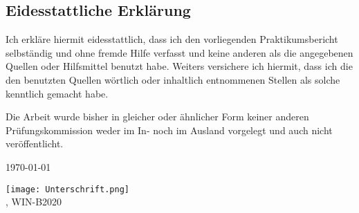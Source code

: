 \subsection*{Eidesstattliche Erklärung}

Ich erkläre hiermit eidesstattlich, dass ich den vorliegenden Praktikumsbericht
selbständig und ohne fremde Hilfe verfasst und keine anderen als die
angegebenen Quellen oder Hilfsmittel benutzt habe. Weiters versichere ich
hiermit, dass ich die den benutzten Quellen wörtlich oder inhaltlich
entnommenen Stellen als solche kenntlich gemacht habe.

Die Arbeit wurde bisher in gleicher oder ähnlicher Form keiner anderen
Prüfungskommission weder im In- noch im Ausland vorgelegt und auch nicht
veröffentlicht.

\vspace*{1cm}
\today
\vspace*{1cm}

\texttt{[image: Unterschrift.png]}\\
\myName, WIN-B2020


